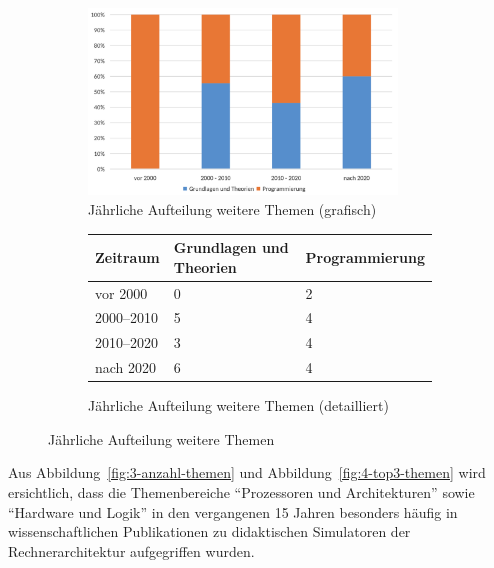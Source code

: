 \begin{figure}[!htbp]
    \centering
    \begin{subfigure}[b]{0.48\textwidth}
        \centering
        \includegraphics[width=0.90\textwidth]{graphics_lit/5-top5-themen-jahr.png}
        \caption{Jährliche Aufteilung weitere Themen (grafisch)}
        \label{fig:5-top5-themen}
    \end{subfigure}
    \hfill
    \begin{subfigure}[b]{0.48\textwidth}
        \centering
        \tiny
        \begin{tabularx}{\textwidth}{lXX}
            \hline
            \textbf{Zeitraum} & \textbf{Grundlagen und Theorien} & \textbf{Programmierung} \\
            \hline
            vor 2000      & 0 & 2 \\
            2000--2010    & 5 & 4 \\
            2010--2020    & 3 & 4 \\
            nach 2020     & 6 & 4 \\
            \hline
        \end{tabularx}
        \caption{Jährliche Aufteilung weitere Themen (detailliert)}
        \label{tab:themen-zeit-2}
    \end{subfigure}
    \caption{Jährliche Aufteilung weitere Themen}
    \label{fig:pub-typen}
\end{figure}

Aus Abbildung~\ref{fig:3-anzahl-themen} und Abbildung~\ref{fig:4-top3-themen} wird ersichtlich, dass die Themenbereiche \enquote{Prozessoren und Architekturen} sowie \enquote{Hardware und Logik} in den vergangenen 15 Jahren besonders häufig in wissenschaftlichen Publikationen zu didaktischen Simulatoren der Rechnerarchitektur aufgegriffen wurden.  

